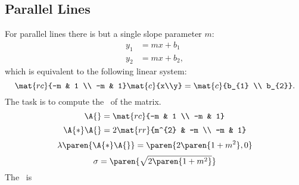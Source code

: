 \subsection{Parallel Lines}  %
For parallel lines there is but a single slope parameter $m$:
  \begin{equation*}   %
    \begin{split}
      y_{1} &= mx + b_{1} \\
      y_{2} &= mx + b_{2},
    \end{split}
  \end{equation*}
which is equivalent to the following linear system:
  \begin{equation*}   %
    \mat{rc}{-m & 1 \\ -m & 1} \mat{c}{x\\y} = \mat{c}{b_{1} \\ b_{2}}.
  \end{equation*}
The task is to compute the \asvd \ of the matrix.
  \begin{equation*}   %
    \A{} = \mat{rc}{-m & 1 \\ -m & 1}
  \end{equation*}
%
  \begin{equation*}   %
    \A{*}\A{} = 2 \mat{rr}{m^{2} & -m \\ -m & 1}
  \end{equation*}
%
  \begin{equation*}   %
    \lambda \paren{\A{*}\A{}} = \paren{2\paren{1+m^{2}},0}
  \end{equation*}
%
%
  \begin{equation*}   %
  	\sigma = \paren{\sqrt{2\paren{1+m^{2}}}}
  \end{equation*}
The \asvd \ is
